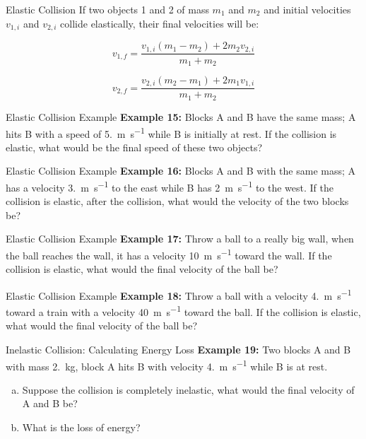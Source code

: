 \documentclass[12pt,compress,aspectratio=169]{beamer}
\begin{document}
\begin{frame}{Elastic Collision}
  If two objects 1 and 2 of mass $m_1$ and $m_2$ and initial velocities
  $v_{1,i}$ and $v_{2,i}$ collide elastically, their final velocities will be:
  
  {\Large
    \begin{displaymath}
      v_{1,f}=\frac{v_{1,i}(m_1-m_2)+2m_2v_{2,i}}{m_1+m_2}
    \end{displaymath}
    
    \begin{displaymath}
      v_{2,f}=\frac{v_{2,i}(m_2-m_1)+2m_1v_{1,i}}{m_1+m_2}
    \end{displaymath}
  }
\end{frame}

\begin{frame}{Elastic Collision Example}
  \textbf{Example 15:} Blocks A and B have the same mass; A hits B with a speed
  of \SI{5.}{\metre\per\second} while B is initially at rest. If the collision
  is elastic, what would be the final speed of these two objects?
\end{frame}



\begin{frame}{Elastic Collision Example}
  \textbf{Example 16:} Blocks A and B with the same mass; A has a velocity
  \SI{3.}{\metre\per\second} to the east while B has \SI{2}{\metre\per\second}
  to the west. If the collision is elastic, after the collision, what would the
  velocity of the two blocks be?
\end{frame}



\begin{frame}{Elastic Collision Example}
  \textbf{Example 17:} Throw a ball to a really big wall, when the ball reaches
  the wall, it has a velocity \SI{10}{\metre\per\second} toward the wall. If
  the collision is elastic, what would the final velocity of the ball be?
\end{frame}



\begin{frame}{Elastic Collision Example}
  \textbf{Example 18:} Throw a ball with a velocity \SI{4.}{\metre\per\second}
  toward a train with a velocity \SI{40}{\metre\per\second} toward the ball.
  If the collision is elastic, what would the final velocity of the ball be?
\end{frame}


\begin{frame}{Inelastic Collision: Calculating Energy Loss}
  \textbf{Example 19:} Two blocks A and B with mass \SI{2.}{\kilo\gram}, block
  A hits B with velocity \SI{4.}{\metre\per\second} while B is at rest.
  \begin{enumerate}[(a)]
  \item Suppose the collision is completely inelastic, what would the final
    velocity of A and B be?
  \item What is the loss of energy?
  \end{enumerate}
\end{frame}
\end{document}
